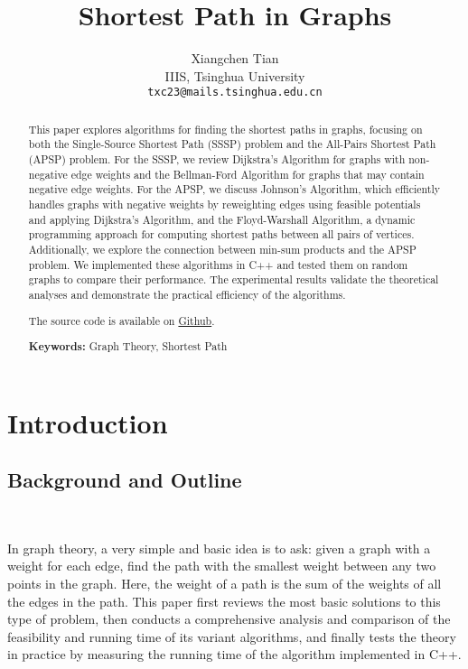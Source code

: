 \documentclass[11pt]{article}
\title{Shortest Path in Graphs}
\author{
    Xiangchen Tian \\
    \fontsize{13}{12}\selectfont
    IIIS, Tsinghua University \\
    \fontsize{13}{12}\selectfont
    \texttt{txc23@mails.tsinghua.edu.cn}
}
\date{}
\theoremstyle{plain}
\begin{document}
\maketitle
\begin{abstract}
  This paper explores algorithms for finding the shortest paths in graphs, focusing on both the 
  Single-Source Shortest Path (SSSP) problem and the All-Pairs Shortest Path (APSP) problem. 
  For the SSSP, we review Dijkstra's Algorithm for graphs with non-negative edge weights and 
  the Bellman-Ford Algorithm for graphs that may contain negative edge weights. For the APSP, 
  we discuss Johnson's Algorithm, which efficiently handles graphs with negative weights by 
  reweighting edges using feasible potentials and applying Dijkstra's Algorithm, and the 
  Floyd-Warshall Algorithm, a dynamic programming approach for computing shortest paths between 
  all pairs of vertices. Additionally, we explore the connection between min-sum products and 
  the APSP problem. We implemented these algorithms in C++ and tested them on random graphs to 
  compare their performance. The experimental results validate the theoretical analyses and 
  demonstrate the practical efficiency of the algorithms. 
  
  The source code is available on \href{https://github.com/Integer003/AlgorithmDesign-project}{Github}.

    \textbf{Keywords:} Graph Theory, Shortest Path
\end{abstract}

\tableofcontents

\newpage
\section{Introduction}
\subsection{Background and Outline}\

In graph theory, a very simple and basic idea is to ask: given a graph with a weight for each edge, 
find the path with the smallest weight between any two points in the graph. Here, the weight of a 
path is the sum of the weights of all the edges in the path. This paper first reviews the most basic 
solutions to this type of problem, then conducts a comprehensive analysis and comparison of the 
feasibility and running time of its variant algorithms, and finally tests the theory in practice by 
measuring the running time of the algorithm implemented in C++.
\end{document}
